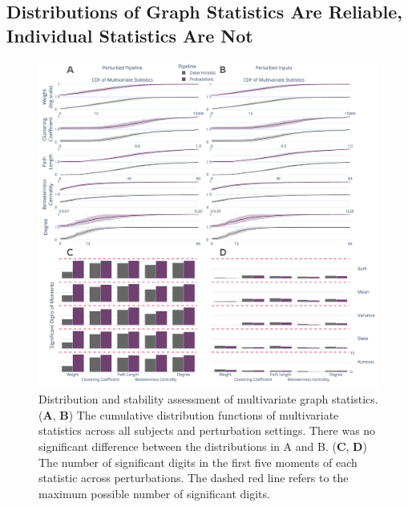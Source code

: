 \documentclass[fleqn,10pt]{SelfArx} %
\begin{document}
\subsection*{Distributions of Graph Statistics Are Reliable, Individual Statistics Are Not}

\begin{figure}[bt!]\centering
\includegraphics[width=\linewidth]{figures/fig2_multivariate_differences.pdf}
\caption{Distribution and stability assessment of multivariate graph statistics. (\textbf{A}, \textbf{B}) The
cumulative distribution functions of multivariate statistics across all subjects and perturbation settings. There was
no significant difference between the distributions in A and B. (\textbf{C}, \textbf{D}) The number of significant
digits in the first five moments of each statistic across perturbations. The dashed red line refers to the maximum
possible number of significant digits.}
\label{fig:multivar}
\end{figure}
\end{document}
